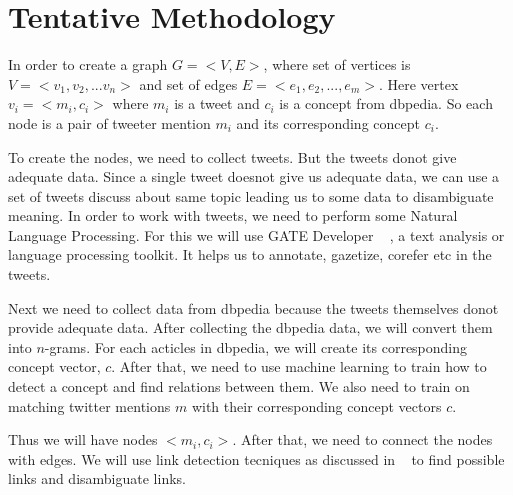 \chapter{Tentative Methodology}\label{ch3}
In order to create a graph $G = <V,E>$, where set of vertices is $V = <v_1,v_2,... v_n>$ and
set of edges $E = <e_1, e_2,...,e_m>$. Here vertex $v_i = <m_i, c_i>$ where $m_i$ is a tweet and $c_i$
is a concept from dbpedia.
So each node is a pair of tweeter mention $m_i$ and its corresponding concept $c_i$.

To create the nodes, we need to collect tweets. But the tweets donot give adequate data. 
Since a single tweet doesnot give us adequate data, we can use a set of tweets discuss about same topic 
leading us to some data to disambiguate meaning. In order to work with tweets, we need to 
perform some Natural Language Processing. For this we will use GATE Developer ~\cite{url0gate} , a 
text analysis or language processing toolkit. It helps us to annotate, gazetize, corefer
 etc in the tweets.


Next we need to collect data from dbpedia because the tweets themselves 
donot provide adequate data. After collecting the dbpedia data, we will convert them into $n$-grams.
For each acticles in dbpedia, we will create its corresponding concept vector, $c$. After that, we need to 
use machine learning to train how to detect a concept and find relations between them. We also need 
to train on matching twitter mentions $m$ with their corresponding concept vectors $c$.
 
 Thus we will have nodes $<m_i, c_i>$. After that, we need to connect the nodes with edges. 
 We will use link detection tecniques as discussed in ~\cite{ref3LinkWikipedia} to 
 find possible links and disambiguate links.


\endinput